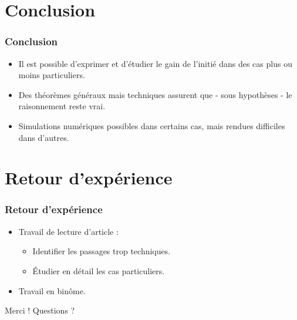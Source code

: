\documentclass{beamer}
\begin{document}
\section{Conclusion}

\begin{frame}
\frametitle{Conclusion}
\begin{itemize}
\item Il est possible d'exprimer et d'étudier le gain de l'initié dans des cas plus ou moins particuliers.
\item Des théorèmes généraux mais techniques assurent que - sous hypothèses - le raisonnement reste vrai.
\item Simulations numériques possibles dans certains cas, mais rendues difficiles dans d'autres.
\end{itemize}
\end{frame}

\section{Retour d'expérience}

\begin{frame}
\frametitle{Retour d'expérience}
\begin{itemize}
\item Travail de lecture d'article :
	\begin{itemize}
	\item Identifier les passages trop techniques.
	\item Étudier en détail les cas particuliers.
	\end{itemize}
\item Travail en binôme.
\end{itemize}
\end{frame}


\begin{frame}
\Huge \center Merci !
\huge\center Questions ?
\end{frame}


\begin{frame}
\end{frame} %
\end{document}
